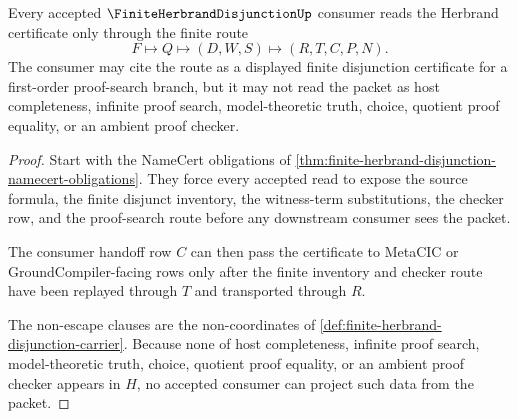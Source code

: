 \begin{theorem}
\label{thm:finite-herbrand-disjunction-nonescape}
Every accepted $\FiniteHerbrandDisjunctionUp$ consumer reads the Herbrand certificate only through the finite route
$$
F\longmapsto Q\longmapsto(D,W,S)\longmapsto(R,T,C,P,N).
$$
The consumer may cite the route as a displayed finite disjunction certificate for a first-order proof-search branch, but it may not read the packet as host completeness, infinite proof search, model-theoretic truth, choice, quotient proof equality, or an ambient proof checker.
\end{theorem}
\begin{proof}
Start with the NameCert obligations of \autoref{thm:finite-herbrand-disjunction-namecert-obligations}. They force every accepted read to expose the source formula, the finite disjunct inventory, the witness-term substitutions, the checker row, and the proof-search route before any downstream consumer sees the packet.

The consumer handoff row $C$ can then pass the certificate to MetaCIC or GroundCompiler-facing rows only after the finite inventory and checker route have been replayed through $T$ and transported through $R$.

The non-escape clauses are the non-coordinates of \autoref{def:finite-herbrand-disjunction-carrier}. Because none of host completeness, infinite proof search, model-theoretic truth, choice, quotient proof equality, or an ambient proof checker appears in $H$, no accepted consumer can project such data from the packet.
\end{proof}


\begin{closurestatus}{\FiniteHerbrandDisjunctionUp}
  \theoryclosure{\seedClosure}
  \formalstatus{\unformalizedV}
\end{closurestatus}
